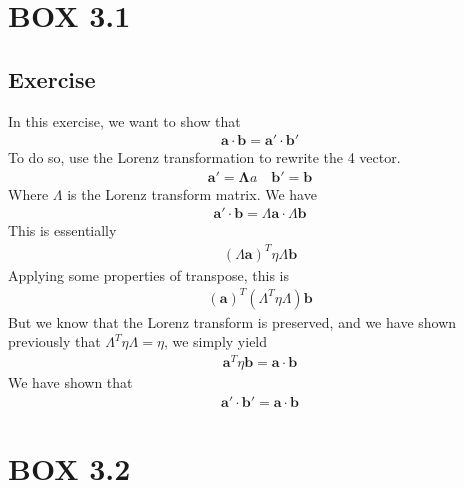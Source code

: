 \documentclass[12pt]{memoir}
\newcommand{\paren}[1]{\left( #1 \right)}
\begin{document}
        \section{BOX 3.1}
            \subsection{Exercise}
            In this exercise, we want to show that
            \begin{align}
            \mathbf{a}\cdot \mathbf{b} = \mathbf{a}' \cdot \mathbf{b}'
            \end{align}
            To do so, use the Lorenz transformation to rewrite the 4 vector. 
            \begin{align}
            \mathbf{a}' = \mathbf{\Lambda}a \quad \mathbf{b}' = \mathbf{b}
            \end{align}
            Where $\Lambda$ is the Lorenz transform matrix. We have
            \begin{align}
            \mathbf{a}'\cdot \mathbf{b} = \Lambda\mathbf{a}\cdot \Lambda\mathbf{b}
            \end{align}
            This is essentially
            \begin{align}
            \paren{\Lambda \mathbf{a}}^T\eta\Lambda\mathbf{b}
            \end{align}
            Applying some properties of transpose, this is
            \begin{align}
            \paren{\mathbf{a}}^T\paren{\Lambda^T\eta\Lambda}\mathbf{b}
            \end{align}
            But we know that the Lorenz transform is preserved, and we have shown previously that $\Lambda^T\eta\Lambda = \eta$, we simply yield
            \begin{align}
            \mathbf{a}^T\eta\mathbf{b} = \mathbf{a}\cdot\mathbf{b}
            \end{align}
            We have shown that
            \begin{align}
            \mathbf{a}'\cdot\mathbf{b}' =\mathbf{a}\cdot\mathbf{b}
            \end{align}

        \section{BOX 3.2}
\end{document}
